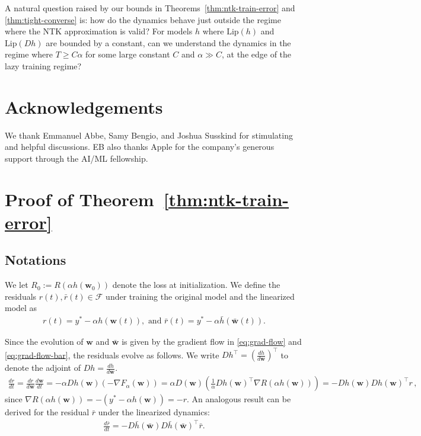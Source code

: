 \documentclass[11pt]{article} %
\newcommand{\<}{\langle}
\renewcommand{\>}{\rangle}
\def\bw{{\boldsymbol w}}
\def\cF{{\mathcal F}}
\def\cF{{\mathcal F}}
\def\barbw{\bar{\bw}}
\newcommand{\Lip}{\mathrm{Lip}}
\theoremstyle{plain}
\theoremstyle{definition}
\theoremstyle{remark}
\begin{document}
A natural question raised by our bounds in Theorems~\ref{thm:ntk-train-error} and \ref{thm:tight-converse} is: how do the dynamics behave just outside the regime where the NTK approximation is valid? For models $h$ where $\Lip(h)$ and $\Lip(Dh)$ are bounded by a constant, can we understand the dynamics in the regime where $T \geq C \alpha$ for some large constant $C$ and $\alpha \gg C$, at the edge of the lazy training regime?

\section*{Acknowledgements}
We thank Emmanuel Abbe, Samy Bengio, and Joshua Susskind for stimulating and helpful discussions. EB also thanks
Apple for the company's generous support through the AI/ML fellowship.




\appendix 

\section{Proof of Theorem~\ref{thm:ntk-train-error}}\label{app:main-proof}

\subsection{Notations}
We let
$R_0 := R(\alpha h(\bw_0))$ denote the loss at initialization. We define the residuals $r(t),\bar{r}(t) \in \cF$ under training the original model and the linearized model as
\begin{align*}
r(t) = y^* - \alpha h(\bw(t)), \mbox{ and } \bar{r}(t) = y^* - \alpha \bar{h}(\bar\bw(t)).
\end{align*}

Since the evolution of $\bw$ and $\bar\bw$ is given by the gradient flow in \eqref{eq:grad-flow} and \eqref{eq:grad-flow-bar}, the residuals evolve as follows. We write $Dh^{\top} = \left(\frac{dh}{d\bw}\right)^{\top}$ to denote the adjoint of $Dh = \frac{dh}{d\bw}$.
\begin{align*}
\frac{dr}{dt} = \frac{dr}{d\bw}\frac{d\bw}{dt} = -\alpha Dh(\bw)(-\nabla F_{\alpha}(\bw)) = \alpha D(\bw) (\frac{1}{\alpha} Dh(\bw)^{\top} \nabla R(\alpha h(\bw))) = -Dh(\bw)Dh(\bw)^{\top} r\,,
\end{align*}
since $\nabla R(\alpha h(\bw)) = -(y^* - \alpha h(\bw)) = -r$. An analogous result can be derived for the residual $\bar{r}$ under the linearized dynamics:
\begin{align*}
\frac{d\bar r}{dt} = -D\bar h(\barbw)D\bar h(\barbw)^{\top} \bar r.
\end{align*}
\end{document}
